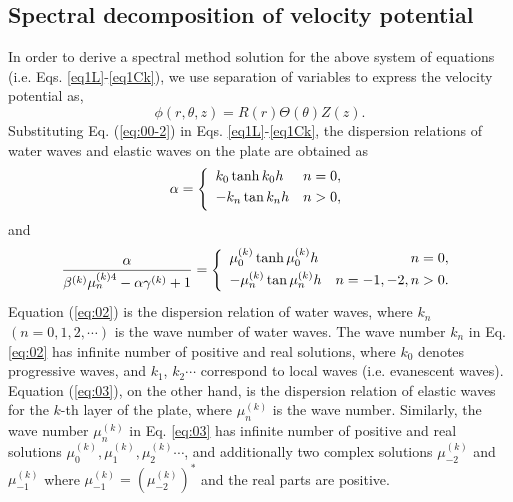 \documentclass{jfm}
\begin{document}
\subsection{Spectral decomposition of velocity potential}
%
In order to derive a spectral method solution for the above system of equations (i.e. Eqs. \eqref{eq1L}-\eqref{eq1Ck}), we use separation of variables to express the velocity potential \cite[e.g.][]{Newman1977} as,
%
\begin{equation}
    \phi(r,\theta,z)=R(r)\Theta(\theta)Z(z).
    \label{eq:00-2}
\end{equation}
% 
Substituting Eq. (\ref{eq:00-2}) in Eqs. \eqref{eq1L}-\eqref{eq1Ck}, the dispersion relations of water waves and elastic waves on the plate are obtained as
\begin{eqnarray}
\alpha=\left\{\begin{array}{lr}
\vspace{1mm}
\displaystyle k_0\tanh{k_0h} &n=0,\\
\vspace{1mm}
\displaystyle -k_n\tan{k_nh} & n> 0,
\end{array}\right.
\label{eq:02}
\end{eqnarray}
and
\begin{eqnarray}
\displaystyle\frac{\alpha}{\beta^{(k)}\mu_n^{(k)4}-\alpha\gamma^{(k)}+1}=\left\{\begin{array}{lr}
\vspace{1mm}
\displaystyle \mu_0^{(k)}\tanh{\mu_0^{(k)}h} &n=0,\\
\vspace{1mm}
\displaystyle -\mu_n^{(k)}\tan{\mu_n^{(k)}h} & n=-1,-2,n> 0.
\end{array}\right.
\label{eq:03}
\end{eqnarray}
Equation (\ref{eq:02}) is the dispersion relation of water waves, where $k_n$ $(n=0,1,2,\cdots)$ is the wave number of water waves.
The wave number $k_n$ in Eq. \eqref{eq:02} has infinite number of positive and real solutions, where $k_0$ denotes progressive waves, and $k_1$, $k_2\cdots$ correspond to local waves (i.e. evanescent waves). Equation (\ref{eq:03}), on the other hand, is the dispersion relation of elastic waves for the $k$-th layer of the plate, where $\mu^{(k)}_n$ is the wave number. Similarly, the wave number $\mu^{(k)}_n$ in Eq. \eqref{eq:03} has infinite number of positive and real solutions $\mu^{(k)}_0,\mu^{(k)}_1,\mu^{(k)}_2\cdots$, and additionally two complex solutions $\mu^{(k)}_{-2}$ and $\mu^{(k)}_{-1}$ where $\mu^{(k)}_{-1}=(\mu^{(k)}_{-2})^*$ and the real parts are positive.
\end{document}
